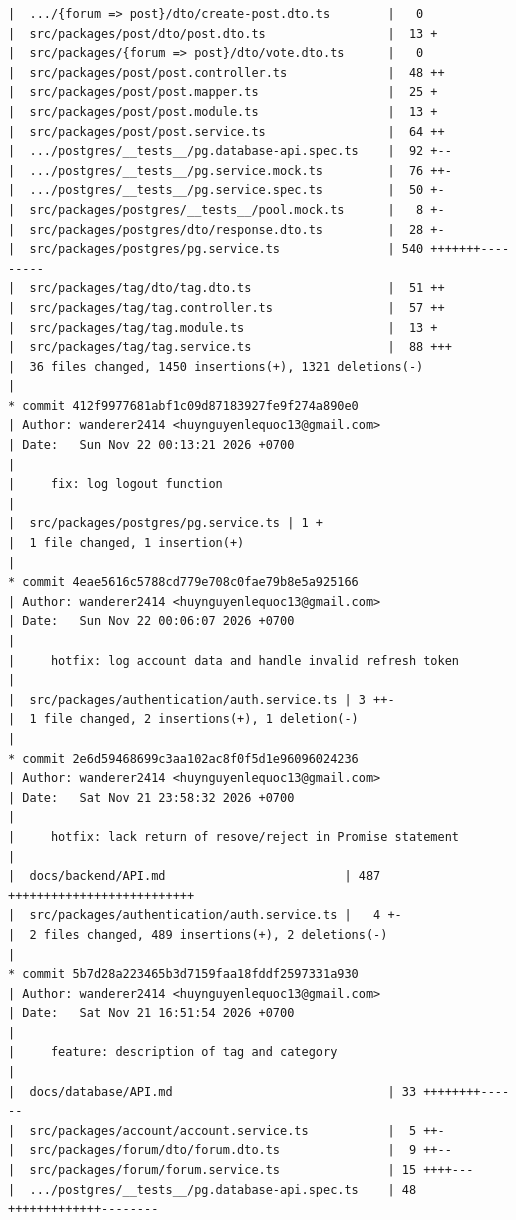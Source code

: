 \documentclass[12pt]{article}
\begin{document}
\begin{lstlisting}[numbers=none,breaklines=true]
|  .../{forum => post}/dto/create-post.dto.ts        |   0
|  src/packages/post/dto/post.dto.ts                 |  13 +
|  src/packages/{forum => post}/dto/vote.dto.ts      |   0
|  src/packages/post/post.controller.ts              |  48 ++
|  src/packages/post/post.mapper.ts                  |  25 +
|  src/packages/post/post.module.ts                  |  13 +
|  src/packages/post/post.service.ts                 |  64 ++
|  .../postgres/__tests__/pg.database-api.spec.ts    |  92 +--
|  .../postgres/__tests__/pg.service.mock.ts         |  76 ++-
|  .../postgres/__tests__/pg.service.spec.ts         |  50 +-
|  src/packages/postgres/__tests__/pool.mock.ts      |   8 +-
|  src/packages/postgres/dto/response.dto.ts         |  28 +-
|  src/packages/postgres/pg.service.ts               | 540 +++++++---------
|  src/packages/tag/dto/tag.dto.ts                   |  51 ++
|  src/packages/tag/tag.controller.ts                |  57 ++
|  src/packages/tag/tag.module.ts                    |  13 +
|  src/packages/tag/tag.service.ts                   |  88 +++
|  36 files changed, 1450 insertions(+), 1321 deletions(-)
|
* commit 412f9977681abf1c09d87183927fe9f274a890e0
| Author: wanderer2414 <huynguyenlequoc13@gmail.com>
| Date:   Sun Nov 22 00:13:21 2026 +0700
|
|     fix: log logout function
|
|  src/packages/postgres/pg.service.ts | 1 +
|  1 file changed, 1 insertion(+)
|
* commit 4eae5616c5788cd779e708c0fae79b8e5a925166
| Author: wanderer2414 <huynguyenlequoc13@gmail.com>
| Date:   Sun Nov 22 00:06:07 2026 +0700
|
|     hotfix: log account data and handle invalid refresh token
|
|  src/packages/authentication/auth.service.ts | 3 ++-
|  1 file changed, 2 insertions(+), 1 deletion(-)
|
* commit 2e6d59468699c3aa102ac8f0f5d1e96096024236
| Author: wanderer2414 <huynguyenlequoc13@gmail.com>
| Date:   Sat Nov 21 23:58:32 2026 +0700
|
|     hotfix: lack return of resove/reject in Promise statement
|
|  docs/backend/API.md                         | 487 ++++++++++++++++++++++++++
|  src/packages/authentication/auth.service.ts |   4 +-
|  2 files changed, 489 insertions(+), 2 deletions(-)
|
* commit 5b7d28a223465b3d7159faa18fddf2597331a930
| Author: wanderer2414 <huynguyenlequoc13@gmail.com>
| Date:   Sat Nov 21 16:51:54 2026 +0700
|
|     feature: description of tag and category
|
|  docs/database/API.md                              | 33 ++++++++------
|  src/packages/account/account.service.ts           |  5 ++-
|  src/packages/forum/dto/forum.dto.ts               |  9 ++--
|  src/packages/forum/forum.service.ts               | 15 ++++---
|  .../postgres/__tests__/pg.database-api.spec.ts    | 48 +++++++++++++--------

\end{lstlisting}
\end{document}
